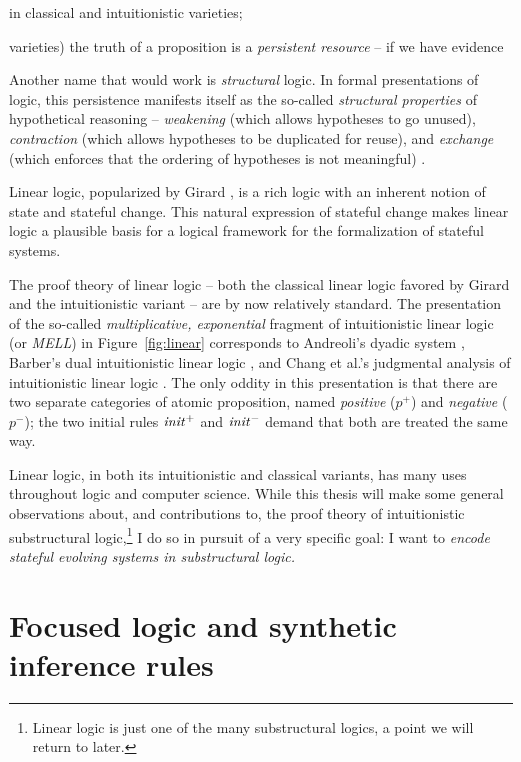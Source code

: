 in classical and intuitionistic varieties; 

varieties) the truth of a proposition is a {\it persistent resource} --
if we have evidence 

Another name that would work
is {\it structural} logic. In formal presentations of logic, this
persistence manifests itself as the so-called {\it structural
  properties} of hypothetical reasoning -- {\it weakening} (which
allows hypotheses to go unused), {\it contraction} (which allows
hypotheses to be duplicated for reuse), and {\it exchange} (which
enforces that the ordering of hypotheses is not meaningful)
\cite{gentzen35untersuchungen}.

Linear logic, popularized by Girard \cite{girard87linear}, is a rich
logic with an inherent notion of state and stateful change. This
natural expression of stateful change makes linear logic a plausible
basis for a logical framework for the formalization of stateful
systems. 


The proof theory of linear logic -- both the classical linear logic
favored by Girard and the intuitionistic variant -- are by now
relatively standard. The presentation of the so-called {\it
  multiplicative, exponential} fragment of intuitionistic linear logic
(or {\it MELL}) in Figure~\ref{fig:linear} corresponds to Andreoli's
dyadic system \cite{andreoli92logic}, Barber's dual intuitionistic
linear logic \cite{barber96dual}, and Chang et al.'s judgmental
analysis of intuitionistic linear logic \cite{chang03judgmental}.  The
only oddity in this presentation is that there are two separate
categories of atomic proposition, named {\it positive} ($p^+$) and
{\it negative} ($p^-$); the two initial rules ${\it init}^+$ and ${\it
  init}^-$ demand that both are treated the same way.

Linear logic, in both its intuitionistic and classical variants, has
many uses throughout logic and computer science. While this thesis
will make some general observations about, and contributions to, the
proof theory of intuitionistic substructural logic,\footnote{Linear logic is
just one of the many substructural logics, a point we will return to
later.} I do so in pursuit of a very specific goal: I want to {\it encode
stateful evolving systems in substructural logic.}

\section{Focused logic and synthetic inference rules}


